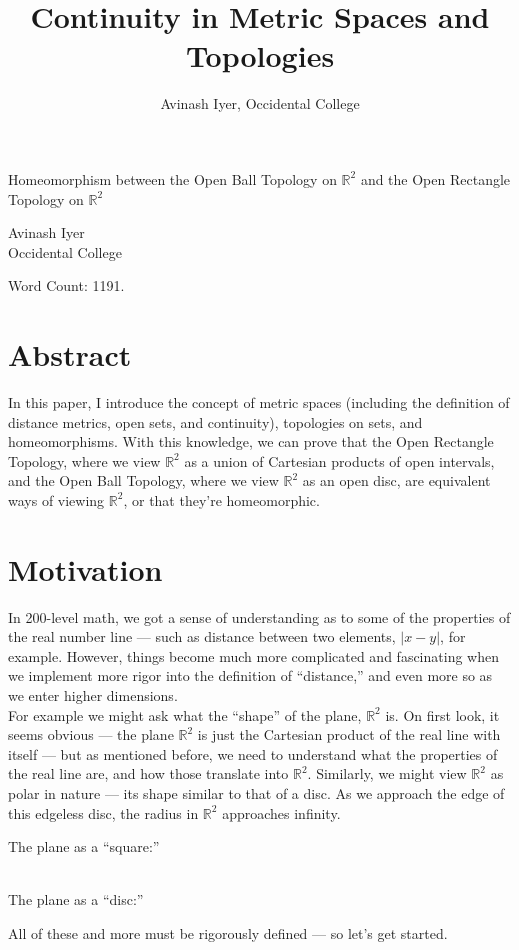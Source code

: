 \documentclass[12pt]{extarticle}
\title{Continuity in Metric Spaces and Topologies}
\author{Avinash Iyer, Occidental College}
\date{}
\newcommand{\R}{\mathbb{R}}
\begin{document}
\doublespacing
  \begin{center}
    \large \sc Homeomorphism between the Open Ball Topology on $\R^2$ and the Open Rectangle Topology on $\R^2$
  \end{center}
  \begin{center}
    Avinash Iyer\\
    Occidental College
  \end{center}
  Word Count: 1191.
  \section*{Abstract}%
  In this paper, I introduce the concept of metric spaces (including the definition of distance metrics, open sets, and continuity), topologies on sets, and homeomorphisms. With this knowledge, we can prove that the Open Rectangle Topology, where we view $\R^2$ as a union of Cartesian products of open intervals, and the Open Ball Topology, where we view $\R^2$ as an open disc, are equivalent ways of viewing $\R^2$, or that they're homeomorphic.
  \section*{Motivation}%
  In 200-level math, we got a sense of understanding as to some of the properties of the real number line --- such as distance between two elements, $|x-y|$, for example. However, things become much more complicated and fascinating when we implement more rigor into the definition of ``distance,'' and even more so as we enter higher dimensions.\\

  For example we might ask what the ``shape'' of the plane, $\R^2$ is. On first look, it seems obvious --- the plane $\R^2$ is just the Cartesian product of the real line with itself --- but as mentioned before, we need to understand what the properties of the real line are, and how those translate into $\R^2$. Similarly, we might view $\R^2$ as polar in nature --- its shape similar to that of a disc. As we approach the edge of this edgeless disc, the radius in $\R^2$ approaches infinity.\\

  \begin{center}
    The plane as a ``square:''\\
    \vspace{12pt}
    \vspace{12pt}\\
    The plane as a ``disc:''\\
    \vspace{12pt}
  \end{center}
  All of these and more must be rigorously defined --- so let's get started.
\end{document}
